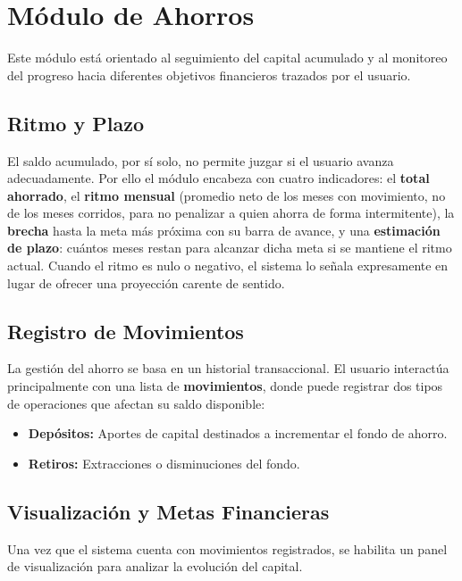 \section{Módulo de Ahorros}
Este módulo está orientado al seguimiento del capital acumulado y al monitoreo del progreso hacia diferentes objetivos financieros trazados por el usuario.

\subsection{Ritmo y Plazo}
El saldo acumulado, por sí solo, no permite juzgar si el usuario avanza adecuadamente. Por ello el módulo encabeza con cuatro indicadores: el \textbf{total ahorrado}, el \textbf{ritmo mensual} (promedio neto de los meses con movimiento, no de los meses corridos, para no penalizar a quien ahorra de forma intermitente), la \textbf{brecha} hasta la meta más próxima con su barra de avance, y una \textbf{estimación de plazo}: cuántos meses restan para alcanzar dicha meta si se mantiene el ritmo actual. Cuando el ritmo es nulo o negativo, el sistema lo señala expresamente en lugar de ofrecer una proyección carente de sentido.

\subsection{Registro de Movimientos}
La gestión del ahorro se basa en un historial transaccional. El usuario interactúa principalmente con una lista de \textbf{movimientos}, donde puede registrar dos tipos de operaciones que afectan su saldo disponible:
\begin{itemize}
    \item \textbf{Depósitos:} Aportes de capital destinados a incrementar el fondo de ahorro.
    \item \textbf{Retiros:} Extracciones o disminuciones del fondo.
\end{itemize}

\subsection{Visualización y Metas Financieras}
Una vez que el sistema cuenta con movimientos registrados, se habilita un panel de visualización para analizar la evolución del capital. 

